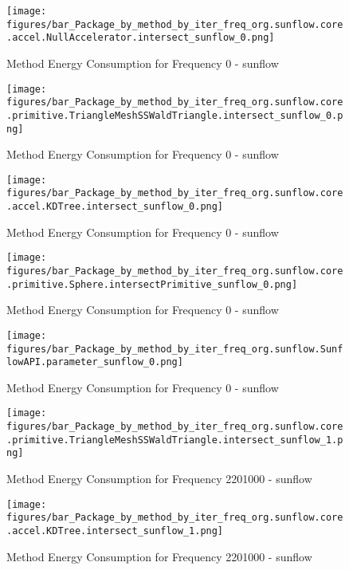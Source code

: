 
				\begin{figure}[H]
				\centering
				\texttt{[image: figures/bar\_Package\_by\_method\_by\_iter\_freq\_org.sunflow.core.accel.NullAccelerator.intersect\_sunflow\_0.png]}
				\caption{Method Energy Consumption for Frequency 0 - sunflow}				
				\end{figure}				
				
				\begin{figure}[H]
				\centering
				\texttt{[image: figures/bar\_Package\_by\_method\_by\_iter\_freq\_org.sunflow.core.primitive.TriangleMeshSSWaldTriangle.intersect\_sunflow\_0.png]}
				\caption{Method Energy Consumption for Frequency 0 - sunflow}				
				\end{figure}				
				
				\begin{figure}[H]
				\centering
				\texttt{[image: figures/bar\_Package\_by\_method\_by\_iter\_freq\_org.sunflow.core.accel.KDTree.intersect\_sunflow\_0.png]}
				\caption{Method Energy Consumption for Frequency 0 - sunflow}				
				\end{figure}				
				
				\begin{figure}[H]
				\centering
				\texttt{[image: figures/bar\_Package\_by\_method\_by\_iter\_freq\_org.sunflow.core.primitive.Sphere.intersectPrimitive\_sunflow\_0.png]}
				\caption{Method Energy Consumption for Frequency 0 - sunflow}				
				\end{figure}				
				
				\begin{figure}[H]
				\centering
				\texttt{[image: figures/bar\_Package\_by\_method\_by\_iter\_freq\_org.sunflow.SunflowAPI.parameter\_sunflow\_0.png]}
				\caption{Method Energy Consumption for Frequency 0 - sunflow}				
				\end{figure}				
				
				\begin{figure}[H]
				\centering
				\texttt{[image: figures/bar\_Package\_by\_method\_by\_iter\_freq\_org.sunflow.core.primitive.TriangleMeshSSWaldTriangle.intersect\_sunflow\_1.png]}
				\caption{Method Energy Consumption for Frequency 2201000 - sunflow}				
				\end{figure}				
				
				\begin{figure}[H]
				\centering
				\texttt{[image: figures/bar\_Package\_by\_method\_by\_iter\_freq\_org.sunflow.core.accel.KDTree.intersect\_sunflow\_1.png]}
				\caption{Method Energy Consumption for Frequency 2201000 - sunflow}				
				\end{figure}				
				
